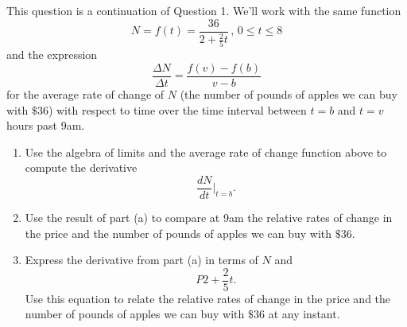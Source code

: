 \documentclass{ximera}
\begin{document}
\begin{question} \label{Q09fdfgsgg}
This question is a continuation of Question 1. We'll work with the same function
\[
     N = f(t) = \frac{36}{2 + \frac{2}{5}t} \, , \, 0\leq t \leq 8
\]
and the expression
\[
 \frac{\Delta N}{\Delta t} = \frac{f(v)-f(b)}{v-b}
\]
for the average rate of change of $N$ (the number of pounds of apples we can buy with $\$36$) with respect to time over the time interval between $t=b$ and $t=v$ hours past 9am.

\begin{enumerate}
\item Use the algebra of limits and the average rate of change function above to compute the derivative
\[
  \frac{dN}{dt}\Big|_{t=b} .
\]

\item Use the result of part (a) to compare at 9am the relative rates of change in the price and the number of pounds of apples we can buy with $\$36$. 

\item Express the derivative from part (a) in terms of $N$ and 
\[
  P  2+ \frac{2}{5}t.
\] 
Use this equation to relate the relative rates of change in the price and the number of pounds of apples we can buy with $\$36$ at any instant. 


\end{enumerate}
\end{question}
\end{document}
